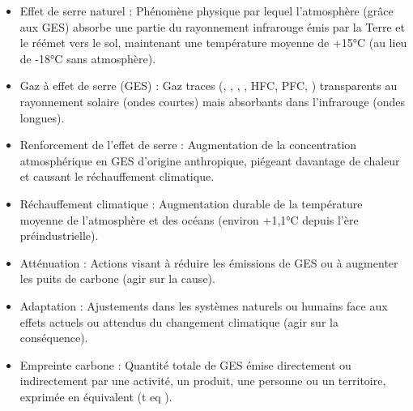 \documentclass[11pt]{article}
\newcommand{\cle}[1]{{\popxbold\color{popdark}#1}}
\begin{document}
\begin{definition}
\begin{itemize}
    \item \cle{Effet de serre naturel} : Ph\'enom\`ene physique par lequel l'atmosph\`ere (gr\^ace aux GES) absorbe une partie du rayonnement infrarouge \'emis par la Terre et le r\'e\'emet vers le sol, maintenant une temp\'erature moyenne de +15°C (au lieu de -18°C sans atmosph\`ere).
    \item \cle{Gaz \`a effet de serre (GES)} : Gaz traces (, , , , HFC, PFC, ) transparents au rayonnement solaire (ondes courtes) mais absorbants dans l'infrarouge (ondes longues).
    \item \cle{Renforcement de l'effet de serre} : Augmentation de la concentration atmosph\'erique en GES d'origine anthropique, pi\'egeant davantage de chaleur et causant le r\'echauffement climatique.
    \item \cle{R\'echauffement climatique} : Augmentation durable de la temp\'erature moyenne de l'atmosph\`ere et des oc\'eans (environ +1,1°C depuis l'ère préindustrielle).
    \item \cle{Att\'enuation} : Actions visant à r\'eduire les \'emissions de GES ou à augmenter les puits de carbone (agir sur la cause).
    \item \cle{Adaptation} : Ajustements dans les syst\`emes naturels ou humains face aux effets actuels ou attendus du changement climatique (agir sur la cons\'equence).
    \item \cle{Empreinte carbone} : Quantit\'e totale de GES \'emise directement ou indirectement par une activit\'e, un produit, une personne ou un territoire, exprim\'ee en \'equivalent  (t eq ).
\end{itemize}
\end{definition}
\end{document}
